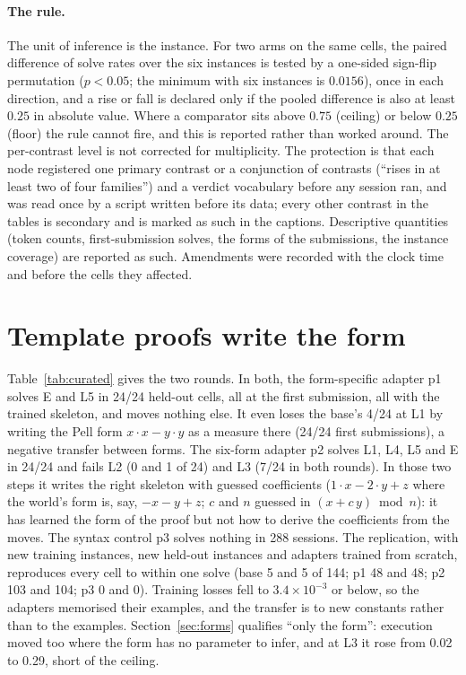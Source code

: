 \documentclass[11pt]{article}
\begin{document}
\paragraph{The rule.} The unit of inference is the instance. For two arms
on the same cells, the paired difference of solve rates over the six
instances is tested by a one-sided sign-flip permutation ($p<0.05$; the
minimum with six instances is $0.0156$), once in each direction, and a
rise or fall is declared only if the pooled difference is also at least
$0.25$ in absolute value. Where a comparator sits above $0.75$ (ceiling)
or below $0.25$ (floor) the rule cannot fire, and this is reported rather
than worked around. The per-contrast level is not corrected for
multiplicity. The protection is that each node registered one primary
contrast or a conjunction of contrasts (``rises in at least two of four
families'') and a verdict vocabulary before any session ran, and was read
once by a script written before its data; every other contrast in the
tables is secondary and is marked as such in the captions. Descriptive
quantities (token counts, first-submission solves, the forms of the
submissions, the instance coverage) are reported as such. Amendments were
recorded with the clock time and before the cells they affected.

\section{Template proofs write the form}
\label{sec:curated}

Table~\ref{tab:curated} gives the two rounds. In both, the form-specific
adapter p1 solves E and L5 in 24/24 held-out cells, all at the first
submission, all with the trained skeleton, and moves nothing else. It
even loses the base's 4/24 at L1 by writing the Pell form $x\cdot x-y\cdot
y$ as a measure there (24/24 first submissions), a negative transfer
between forms. The six-form adapter p2 solves L1, L4, L5 and E in 24/24
and fails L2 (0 and 1 of 24) and L3 (7/24 in both rounds). In those two
steps it writes the right skeleton with guessed coefficients
($1\cdot x-2\cdot y+z$ where the world's form is, say, $-x-y+z$; $c$ and
$n$ guessed in $(x+c\,y)\bmod n$): it has learned the form of the proof but not how to derive the coefficients from the moves. The syntax
control p3 solves nothing in 288 sessions. The replication, with new
training instances, new held-out instances and adapters trained from
scratch, reproduces every cell to within one solve (base 5 and 5 of 144;
p1 48 and 48; p2 103 and 104; p3 0 and 0). Training losses fell to
$3.4\times10^{-3}$ or below, so the adapters memorised their examples, and the
transfer is to new constants rather than to the examples.
Section~\ref{sec:forms} qualifies ``only the form'': execution moved too
where the form has no parameter to infer, and at L3 it rose from 0.02 to
0.29, short of the ceiling.
\end{document}
